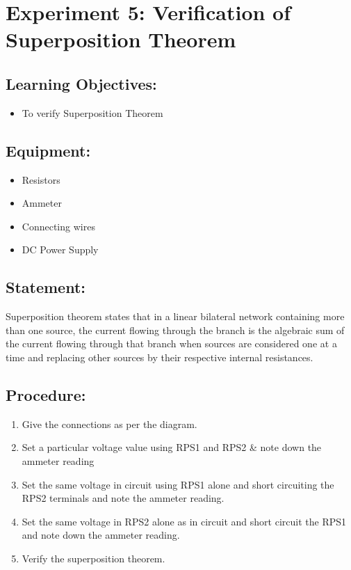 \section*{Experiment 5: Verification of Superposition Theorem}  

\subsection*{Learning Objectives:}
\begin{itemize}
    \item To verify Superposition Theorem
\end{itemize}

\subsection*{Equipment:}
\begin{itemize}
    \item Resistors
    \item Ammeter
    \item Connecting wires
    \item DC Power Supply
\end{itemize}

\subsection*{Statement:}
Superposition theorem states that in a linear bilateral network containing more than one source, the current flowing through the branch is the algebraic sum of the current flowing through that branch when sources are considered one at a time and replacing other sources by their respective internal resistances.

\subsection*{Procedure:}

\begin{enumerate}
    \item Give the connections as per the diagram. 
    \item Set a particular voltage value using RPS1 and RPS2 \& note down the ammeter reading 
    \item Set the same voltage in circuit using RPS1 alone and short circuiting the RPS2 terminals and note the ammeter reading. 
    \item Set the same voltage in RPS2 alone as in circuit and short circuit the RPS1 and note down the ammeter reading. 
    \item Verify the superposition theorem.
\end{enumerate}

